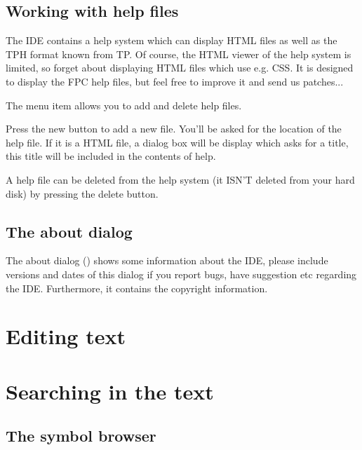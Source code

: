\subsection{Working with help files}
The IDE contains a help system which can display HTML files
as well as the TPH format known from TP. Of course, the HTML
viewer of the help system is limited, so forget about displaying
HTML files which use e.g. CSS. It is designed to display the FPC
help files, but feel free to improve it and send us patches...

The menu item  allows you to add and delete
help files.

Press the new button to add a new file. You'll be asked for the location
of the help file. If it is a HTML file, a dialog box will be display
which asks for a title, this title will be included in the
contents of help.

A help file can be deleted from the help system (it ISN'T deleted from
your hard disk) by pressing the delete button.

\subsection{The about dialog}
The about dialog () shows some information
about the IDE, please include versions and dates of this
dialog if you report bugs, have suggestion etc regarding the IDE.
Furthermore, it contains the copyright information.

\section{Editing text}
\label{ide:editingtext}

\section{Searching in the text}
\label{ide:searching}

\subsection{The symbol browser}

